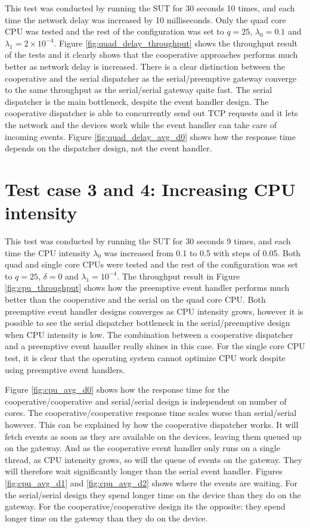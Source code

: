This test was conducted by running the SUT for 30 seconds 10 times, and each
time the network delay was increased by 10 milliseconds. Only the quad core CPU
was tested and the rest of the configuration was set to $q = 25$, $\lambda_0 =
0.1$ and $\lambda_1 = 2 \times 10^{-4}$. Figure \ref{fig:quad_delay_throughput}
shows the throughput result of the tests and it clearly shows that the
cooperative approaches performs much better as network delay is increased.
There is a clear distinction between the cooperative and the serial dispatcher
as the serial/preemptive gateway converge to the same throughput as the
serial/serial gateway quite fast. The serial dispatcher is the main bottleneck,
despite the event handler design. The cooperative dispatcher is able to
concurrently send out TCP requests and it lets the network and the devices work
while the event handler can take care of incoming events. Figure
\ref{fig:quad_delay_avg_d0} shows how the response time depends on the
dispatcher design, not the event handler.

\section{Test case 3 and 4: Increasing CPU intensity}

This test was conducted by running the SUT for 30 seconds 9 times, and each
time the CPU intensity $\lambda_0$ was increased from 0.1 to 0.5 with steps of
0.05. Both quad and single core CPUs were tested and the rest of the
configuration was set to $q = 25$, $\delta = 0$ and $\lambda_1 = 10^{-4}$. The
throughput result in Figure \ref{fig:cpu_throughput} shows how the preemptive
event handler performs much better than the cooperative and the serial on the
quad core CPU. Both preemptive event handler designs converges as CPU intensity
grows, however it is possible to see the serial dispatcher bottleneck in the
serial/preemptive design when CPU intensity is low. The combination between a
cooperative dispatcher and a preemptive event handler really shines in this
case. For the single core CPU test, it is clear that the operating system
cannot optimize CPU work despite using preemptive event handlers.

Figure \ref{fig:cpu_avg_d0} shows how the response time for the
cooperative/cooperative and serial/serial design is independent on number of
cores. The cooperative/cooperative response time scales worse than
serial/serial however. This can be explained by how the cooperative dispatcher
works. It will fetch events as soon as they are available on the devices,
leaving them queued up on the gateway. And as the cooperative event handler
only runs on a single thread, as CPU intensity grows, so will the queue of
events on the gateway. They will therefore wait significantly longer than the
serial event handler. Figures \ref{fig:cpu_avg_d1} and \ref{fig:cpu_avg_d2}
shows where the events are waiting. For the serial/serial design they spend
longer time on the device than they do on the gateway. For the
cooperative/cooperative design its the opposite: they spend longer time on the
gateway than they do on the device.


